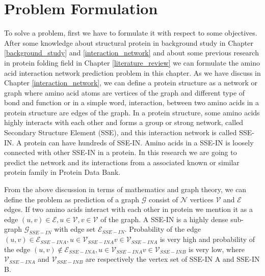 \chapter {Problem Formulation}
\label{chap:formulation}
To solve a problem, first we have to formulate it with respect to some objectives. After some knowledge about structural protein in background study in Chapter \ref{background_study} and \ref{interaction_network} and about some previous research in protein folding field in Chapter \ref{literature_review} we can formulate the amino acid interaction network prediction problem in this chapter. 
As we have discuss in Chapter \ref{interaction_network}, we can define a protein structure as a network or graph where amino acid atoms are vertices of the graph and different type of bond and function or in a simple word, interaction, between two amino acids in a protein structure are edges of the graph. In a protein structure, some amino acids highly interacts with each other and forms a group or strong network, called Secondary Structure Element (SSE), and this interaction network is called SSE-IN. A protein can have hundreds of SSE-IN. Amino acids in a SSE-IN is loosely connected with other SSE-IN in a protein. In this research we are going to predict the network and its interactions from a associated known or similar protein family in Protein Data Bank.

From the above discussion in terms of mathematics and graph theory, we can define the problem as prediction of a graph $\mathcal{G}$ consist of $\mathcal{N}$ vertices $\mathcal{V}$ and $\mathcal{E}$ edges. If two amino acids interact with each other in protein we mention it as a edge $(u,v) \in \mathcal{E}, u \in \mathcal{V}, v \in \mathcal{V}$ of the graph. A SSE-IN is a highly dense sub-graph $\mathcal{G}_{SSE-IN}$ with edge set $\mathcal{E}_{SSE-IN}$. Probability of the edge $(u,v) \in \mathcal{E}_{SSE-IN A}, u \in \mathcal{V}_{SSE-IN A} v \in \mathcal{V}_{SSE-IN A}$ is very high and probability of the edge $(u,v) \notin \mathcal{E}_{SSE-IN A}, u \in \mathcal{V}_{SSE-IN A} v \in \mathcal{V}_{SSE-IN B}$ is very low, where $\mathcal{V}_{SSE-IN A}$ and $\mathcal{V}_{SSE-IN B}$ are respectively the vertex set of SSE-IN A and SSE-IN B.

